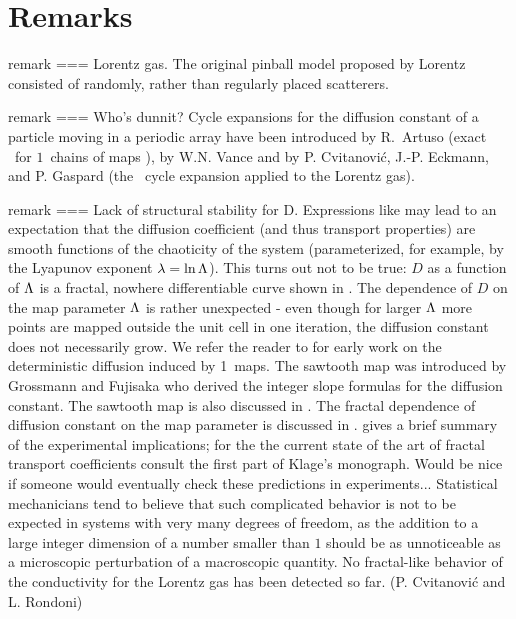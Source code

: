 
  \section{Remarks}

remark === {Lorentz gas.}{
The original pinball model proposed by Lorentz consisted
of randomly, rather than regularly placed scatterers.
} %
%

remark === {Who's dunnit?}{
Cycle expansions for the diffusion constant of a particle
moving in a periodic array have been introduced
by R.~Artuso (exact
\dzeta\ for $1$\dmn\ chains of maps  ),
by W.N. Vance%
\PublicPrivate{,}{%
(the trace formula \refeq{DL-trace} for the Lorentz gas),
      }%
and by
P. Cvitanovi\'c, J.-P. Eckmann, and P. Gaspard
(the \dzeta\ cycle expansion  applied to the  Lorentz gas).
} %

remark === {Lack of structural stability for D.}{
Expressions like  may lead to an expectation that
the diffusion coefficient (and thus transport properties) are
smooth functions of the chaoticity of the system
(parameterized, for example, by the Lyapunov exponent $\lambda =
\ln \Lambda$). This turns out not to be true: $D$ as a
function of $\Lambda$ is a fractal, nowhere differentiable
curve shown in . The dependence of $D$ on the
map parameter $\Lambda$ is rather unexpected - even though for
larger $\Lambda$ more points are mapped outside the unit cell
in one iteration, the diffusion constant does not necessarily
grow. We refer the reader to  for
early work on the deterministic diffusion induced by 1\dmn\
maps. The sawtooth map  was introduced by
Grossmann and Fujisaka who derived the integer slope
formulas \refeq{D-KD} for the diffusion constant. The sawtooth
map is also discussed in . The fractal dependence
of diffusion constant on the map parameter is discussed in
.  gives
a brief summary of the experimental implications; for the the
current state of the art of fractal transport coefficients consult
the first part of Klage's monograph\rf{RKbook07}. Would be nice if
someone would eventually check these predictions in
experiments...
Statistical
mechanicians tend to believe that such complicated behavior is
not to be expected in systems with very many degrees of
freedom, as the addition to a large integer dimension of a
number smaller than $1$ should be as unnoticeable as a
microscopic perturbation of a macroscopic quantity. No
fractal-like behavior of the conductivity for the Lorentz gas
has been detected so far.
\hfill (P. Cvitanovi\'c and L. Rondoni)
} %

